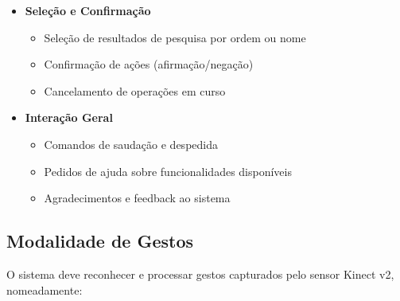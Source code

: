 \begin{itemize}
    \item \textbf{Seleção e Confirmação}
    \begin{itemize}
        \item Seleção de resultados de pesquisa por ordem ou nome
        \item Confirmação de ações (afirmação/negação)
        \item Cancelamento de operações em curso
    \end{itemize}

    \item \textbf{Interação Geral}
    \begin{itemize}
        \item Comandos de saudação e despedida
        \item Pedidos de ajuda sobre funcionalidades disponíveis
        \item Agradecimentos e feedback ao sistema
    \end{itemize}
\end{itemize}

\subsection{Modalidade de Gestos}

O sistema deve reconhecer e processar gestos capturados pelo sensor Kinect v2, nomeadamente:

